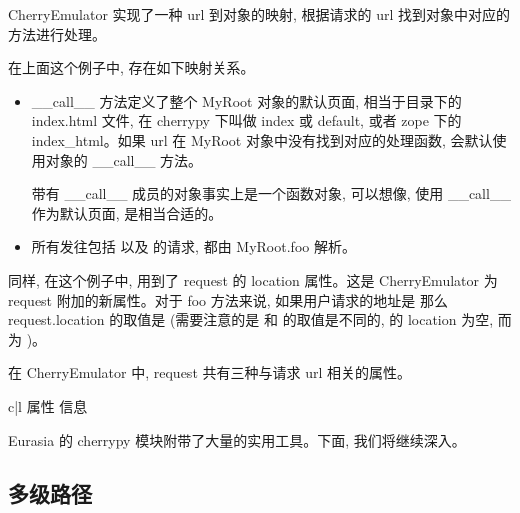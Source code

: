 \documentclass{manual}
\begin{document}
CherryEmulator 实现了一种 url 到对象的映射, 根据请求的 url 找到对象中对应的方法进行处理。

在上面这个例子中, 存在如下映射关系。

\begin{itemize}

\item {}

__call__ 方法定义了整个 MyRoot 对象的默认页面, 相当于目录下的 index.html 文件, 在 cherrypy 下叫做 index 或 default, 或者 zope 下的 index_html。如果 url 在 MyRoot 对象中没有找到对应的处理函数, 会默认使用对象的 __call__ 方法。

带有 __call__ 成员的对象事实上是一个函数对象, 可以想像, 使用 __call__ 作为默认页面, 是相当合适的。

\item {}

所有发往包括  以及  的请求, 都由 MyRoot.foo 解析。

\end{itemize}

同样, 在这个例子中, 用到了 request 的 location 属性。这是 CherryEmulator 为 request 附加的新属性。对于 foo 方法来说, 如果用户请求的地址是  那么 request.location 的取值是  (需要注意的是  和  的取值是不同的,  的 location 为空, 而  为 \file{/})。

在 CherryEmulator 中, request 共有三种与请求 url 相关的属性。

\begin{tableii}{c|l}{}{ 属性 }{ 信息 }
\end{tableii}

Eurasia 的 cherrypy 模块附带了大量的实用工具。下面, 我们将继续深入。


\subsection{多级路径}
\end{document}
